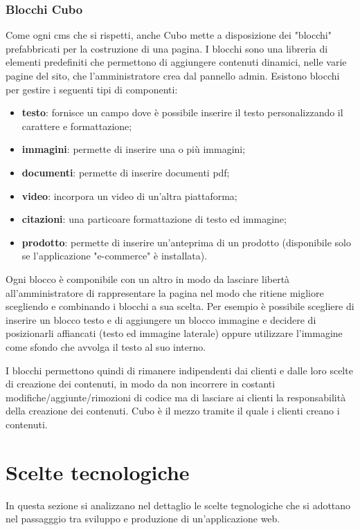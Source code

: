 \documentclass[12pt,a4paper]{article}
\begin{document}
\subsubsection{Blocchi Cubo}
Come ogni cms che si rispetti, anche Cubo mette a disposizione dei "blocchi" prefabbricati per la costruzione di una pagina. I blocchi sono una libreria di elementi predefiniti che permettono di aggiungere contenuti dinamici, nelle varie pagine del sito, che l'amministratore crea dal pannello admin.
Esistono blocchi per gestire i seguenti tipi di componenti:
\begin{itemize}
    \item \textbf{testo}: fornisce un campo dove è possibile inserire il testo personalizzando il carattere e formattazione;
    \item \textbf{immagini}: permette di inserire una o più immagini;
    \item \textbf{documenti}: permette di inserire documenti pdf;
    \item \textbf{video}: incorpora un video di un'altra piattaforma;
    \item \textbf{citazioni}: una particoare formattazione di testo ed immagine;
    \item \textbf{prodotto}: permette di inserire un'anteprima di un prodotto (disponibile solo se l'applicazione "e-commerce" è installata).
\end{itemize}
Ogni blocco è componibile con un altro in modo da lasciare libertà \break all'amministratore di rappresentare la pagina nel modo che ritiene migliore scegliendo e combinando i blocchi a sua scelta. Per esempio è possibile scegliere di  inserire un blocco testo e di aggiungere un blocco immagine e decidere di posizionarli affiancati (testo ed immagine laterale) oppure utilizzare l'immagine come sfondo che avvolga il testo al suo interno.

I blocchi permettono quindi di rimanere indipendenti dai clienti e dalle loro scelte di creazione dei contenuti, in modo da non incorrere in costanti modifiche/aggiunte/rimozioni di codice ma di lasciare ai clienti la responsabilità della creazione dei contenuti. Cubo è il mezzo tramite il quale i clienti creano i contenuti.

\clearpage
\section{Scelte tecnologiche}
In questa sezione si analizzano nel dettaglio le scelte tegnologiche che si adottano nel passagggio tra sviluppo e produzione di un'applicazione web.
\end{document}
